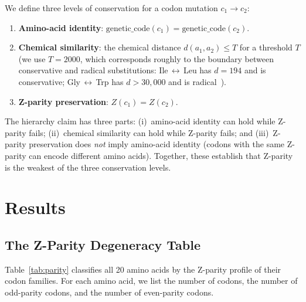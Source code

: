 \documentclass[11pt,twocolumn]{article}
\begin{document}
We define three levels of conservation for a codon mutation $c_1 \to c_2$:
\begin{enumerate}
\item \textbf{Amino-acid identity}: $\text{genetic\_code}(c_1) =
  \text{genetic\_code}(c_2)$.
\item \textbf{Chemical similarity}: the chemical distance
  $d(a_1, a_2) \leq T$ for a threshold $T$ (we use $T = 2000$, which
  corresponds roughly to the boundary between conservative and radical
  substitutions: Ile\,$\leftrightarrow$\,Leu has $d = 194$ and is
  conservative; Gly\,$\leftrightarrow$\,Trp has $d > 30{,}000$ and is
  radical~\cite{Grantham1974}).
\item \textbf{Z-parity preservation}: $Z(c_1) = Z(c_2)$.
\end{enumerate}

The hierarchy claim has three parts: (i)~amino-acid identity can hold
while Z-parity fails; (ii)~chemical similarity can hold while Z-parity
fails; and (iii)~Z-parity preservation does \emph{not} imply amino-acid
identity (codons with the same Z-parity can encode different amino
acids). Together, these establish that Z-parity is the weakest of the
three conservation levels.

\section{Results}

\subsection{The Z-Parity Degeneracy Table}

Table~\ref{tab:parity} classifies all 20 amino acids by the Z-parity
profile of their codon families. For each amino acid, we list the number
of codons, the number of odd-parity codons, and the number of even-parity
codons.
\end{document}
